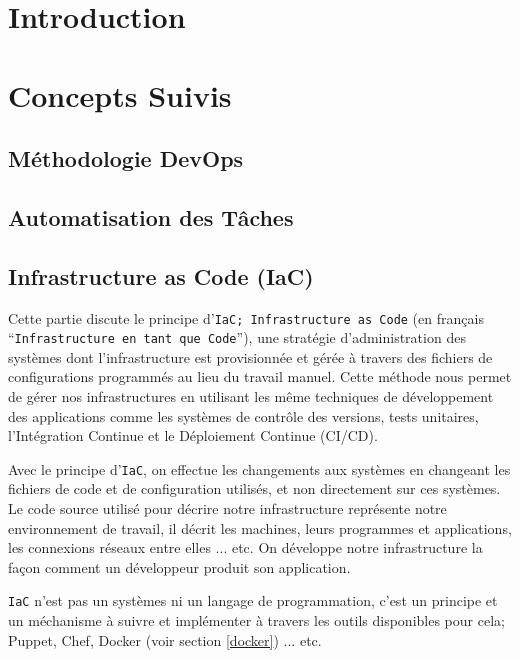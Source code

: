 \section{Introduction}

\section{Concepts Suivis}

\subsection{Méthodologie DevOps}

\subsection{Automatisation des Tâches}

\subsection{Infrastructure as Code (IaC)}
Cette partie discute le principe d'\texttt{IaC; Infrastructure as Code}\cite[Chapter~4]{thePracticeOfSystemAndNetworkAdministration} (en français ``\texttt{Infrastructure en tant que Code}''), une stratégie d'administration des systèmes dont l'infrastructure est provisionnée et gérée à travers des fichiers de configurations programmés au lieu du travail manuel. Cette méthode nous permet de gérer nos infrastructures en utilisant les même techniques de développement des applications comme les systèmes de contrôle des versions, tests unitaires, l'Intégration Continue et le Déploiement Continue (CI/CD). 
\newline

Avec le principe d'\texttt{IaC}, on effectue les changements aux systèmes en changeant les fichiers de code et de configuration utilisés, et non directement sur ces systèmes. Le code source utilisé pour décrire notre infrastructure représente notre environnement de travail, il décrit les machines, leurs programmes et applications, les connexions réseaux entre elles ... etc. On développe notre infrastructure la façon comment un développeur produit son application.
\newline

\texttt{IaC} n'est pas un systèmes ni un langage de programmation, c'est un principe et un méchanisme à suivre et implémenter à travers les outils disponibles pour cela; Puppet\cite{puppetWiki}, Chef\cite{chefWiki}, Docker (voir section \ref{docker}) ... etc.

